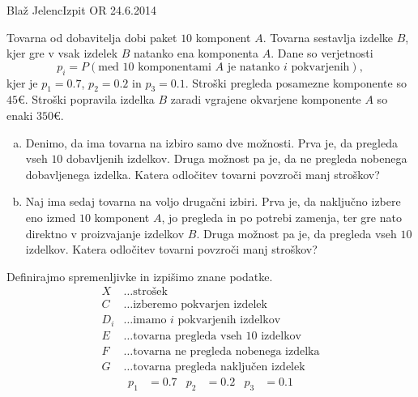 \begin{naloga}{Blaž Jelenc}{Izpit OR 24.6.2014}
\begin{vprasanje}
Tovarna od dobavitelja dobi paket $10$ komponent $A$.
Tovarna sestavlja izdelke $B$,
kjer gre v vsak izdelek $B$ natanko ena komponenta $A$.
Dane so verjetnosti
$$
p_i = P(\text{med $10$ komponentami $A$ je natanko $i$ pokvarjenih}),
$$
kjer je $p_1 = 0.7$, $p_2 = 0.2$ in $p_3 = 0.1$.
Stroški pregleda posamezne komponente so $45 €$.
Stroški popravila izdelka $B$ zaradi vgrajene okvarjene komponente $A$
so enaki $350 €$.
\begin{enumerate}[(a)]
\item Denimo, da ima tovarna na izbiro samo dve možnosti.
Prva je, da pregleda vseh $10$ dobavljenih izdelkov.
Druga možnost pa je, da ne pregleda nobenega dobavljenega izdelka.
Katera odločitev tovarni povzroči manj stroškov?

\item Naj ima sedaj tovarna na voljo drugačni izbiri.
Prva je, da naključno izbere eno izmed $10$ komponent $A$,
jo pregleda in po potrebi zamenja,
ter gre nato direktno v proizvajanje izdelkov $B$.
Druga možnost pa je, da pregleda vseh $10$ izdelkov.
Katera odločitev tovarni povzroči manj stroškov?
\end{enumerate}
\end{vprasanje}

\begin{odgovor}
Definirajmo spremenljivke in izpišimo znane podatke.
\begin{align*}
X &\dots \text{strošek} \\
C &\dots \text{izberemo pokvarjen izdelek} \\
D_i &\dots \text{imamo $i$ pokvarjenih izdelkov} \\
E &\dots \text{tovarna pregleda vseh $10$ izdelkov} \\
F &\dots \text{tovarna ne pregleda nobenega izdelka} \\
G &\dots \text{tovarna pregleda naključen izdelek}
\end{align*}
\begin{align*}
p_1 &= 0.7 & p_2 &= 0.2 & p_3 &= 0.1
\end{align*}


\end{odgovor}
\end{naloga}
